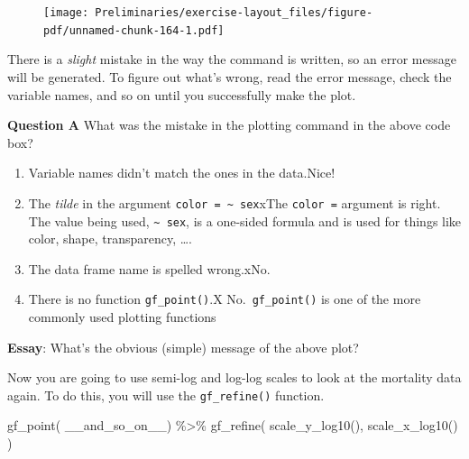 \documentclass[
  letterpaper,
  DIV=11,
  numbers=noendperiod,
  oneside]{article}
\newenvironment{Shaded}{\begin{snugshade}}{\end{snugshade}}
\newcommand{\FunctionTok}[1]{\textcolor[rgb]{0.28,0.35,0.67}{#1}}
\newcommand{\NormalTok}[1]{\textcolor[rgb]{0.00,0.23,0.31}{#1}}
\newcommand{\SpecialCharTok}[1]{\textcolor[rgb]{0.37,0.37,0.37}{#1}}
\providecommand{\tightlist}{%
  \setlength{\itemsep}{0pt}\setlength{\parskip}{0pt}}\usepackage{longtable,booktabs,array}
\begin{document}
\begin{multicols}{2}
\begin{figure}[H]

{\centering \texttt{[image: Preliminaries/exercise-layout\_files/figure-pdf/unnamed-chunk-164-1.pdf]}

}

\end{figure}

There is a \emph{slight} mistake in the way the command is written, so
an error message will be generated. To figure out what's wrong, read the
error message, check the variable names, and so on until you
successfully make the plot.

\textbf{Question A} What was the mistake in the plotting command in the
above code box?

\begin{enumerate}
\def\labelenumi{\roman{enumi}.}
\tightlist
\item
  {Variable names didn't match the ones in the data.{Nice!~}}\\
\item
  {The \emph{tilde} in the argument
  \texttt{color\ =\ \textasciitilde{}\ sex}{xThe \texttt{color\ =}
  argument is right. The value being used,
  \texttt{\textasciitilde{}\ sex}, is a one-sided formula and is used
  for things like color, shape, transparency, \ldots.}}\\
\item
  {The data frame name is spelled wrong.{xNo.}}\\
\item
  {There is no function \texttt{gf\_point()}.{︎X
  No.~\texttt{gf\_point()} is one of the more commonly used plotting
  functions}}
\end{enumerate}

\textbf{Essay}: What's the obvious (simple) message of the above plot?

Now you are going to use semi-log and log-log scales to look at the
mortality data again. To do this, you will use the \texttt{gf\_refine()}
function.

\begin{Shaded}
\begin{Highlighting}[]
\FunctionTok{gf\_point}\NormalTok{( \_\_and\_so\_on\_\_) }\SpecialCharTok{\%\textgreater{}\%}
  \FunctionTok{gf\_refine}\NormalTok{(}
    \FunctionTok{scale\_y\_log10}\NormalTok{(),}
    \FunctionTok{scale\_x\_log10}\NormalTok{()}
\NormalTok{  )}
\end{Highlighting}
\end{Shaded}


\end{multicols}
\end{document}
